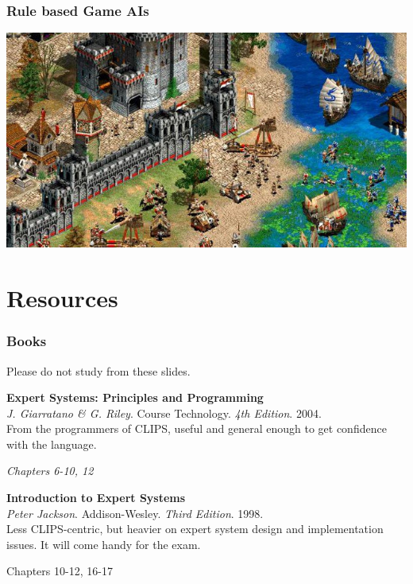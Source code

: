 \documentclass[xcolor={usenames,dvipsnames,svgnames}, compress]{beamer}
\begin{document}
\begin{frame}
  \frametitle{Rule based Game AIs}
  \begin{center}
    \includegraphics[width=1.0\textwidth]{Figures/aokii-crop}
  \end{center}
\end{frame}

\section{Resources}
{
  \begin{frame}
    \sectionpage
  \end{frame}
}

\begin{frame}
  \frametitle{Books}
  Please do not study from these slides.\par\bigskip
  
  
  \textbf{Expert Systems: Principles and Programming}\\
  \emph{J. Giarratano \& G. Riley}. Course Technology. \emph{4th
  Edition}. 2004.\\
  From the programmers of CLIPS, useful and general enough to get
  confidence with the language.
  \begin{flushright}
    \vspace{-5pt}
    \emph{Chapters 6-10, 12}
  \end{flushright}
  
  
  
  \textbf{Introduction to Expert Systems}\\
  \emph{Peter Jackson}. Addison-Wesley. \emph{Third Edition}. 1998.\\
  Less CLIPS-centric, but heavier on expert system design and
  implementation issues. It will come handy for the exam.
  \begin{flushright}
    \vspace{-5pt}
    Chapters 10-12, 16-17
  \end{flushright}
  
  
\end{frame}
\end{document}
